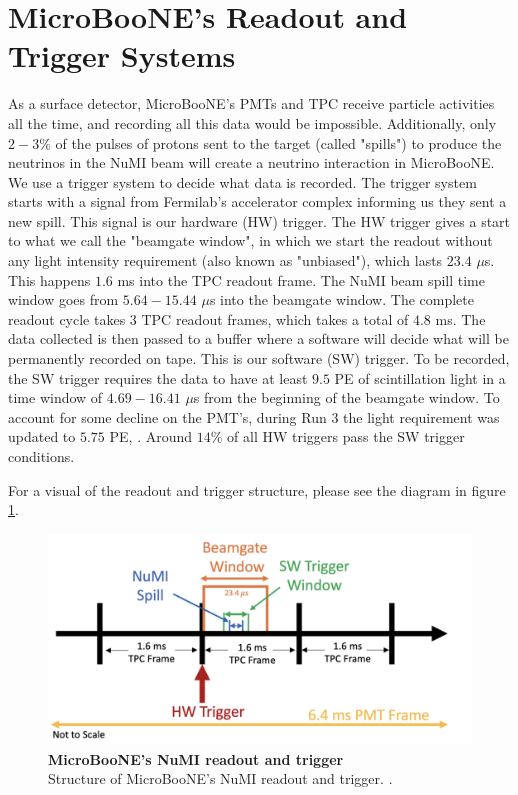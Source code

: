 \section{MicroBooNE's Readout and Trigger Systems}

As a surface detector, MicroBooNE's PMTs and TPC receive particle activities all the time, and recording all this data would be impossible. Additionally, only $2-3\%$ of the pulses of protons sent to the target (called "spills") to produce the neutrinos in the NuMI beam will create a neutrino interaction in MicroBooNE. We use a trigger system to decide what data is recorded.
The trigger system starts with a signal from Fermilab's accelerator complex informing us they sent a new spill. This signal is our hardware (HW) trigger. The HW trigger gives a start to what we call the "beamgate window", in which we start the readout without any light intensity requirement (also known as "unbiased"), which lasts $23.4$ $\mu $s. This happens $1.6$ ms into the TPC readout frame. The NuMI beam spill time window goes from $5.64- 15.44$ $\mu$s into the beamgate window. The complete readout cycle takes 3 TPC readout frames, which takes a total of $4.8$ ms.
The data collected is then passed to a buffer where a software will decide what will be permanently recorded on tape. This is our software (SW) trigger. To be recorded, the SW trigger requires the data to have at least $9.5$ PE of scintillation light in a time window of $4.69- 16.41$ $\mu$s from the beginning of the beamgate window. To account for some decline on the PMT's, during Run 3 the light requirement was updated to $5.75$ PE, \cite{numi_redmine}. 
Around $14\%$ of all HW triggers pass the SW trigger conditions. 

For a visual of the readout and trigger structure, please see the diagram in figure \ref{trig}.

\begin{figure}[h!]
    \centering
    \includegraphics[width=150mm]{Figures/numi_trigger.jpg}
    \caption[MicroBooNE's NuMI readout and trigger]{\textbf{MicroBooNE's NuMI readout and trigger}\\Structure of MicroBooNE's NuMI readout and trigger. \cite{krish_phd}.}
    \label{trig}
\end{figure}

